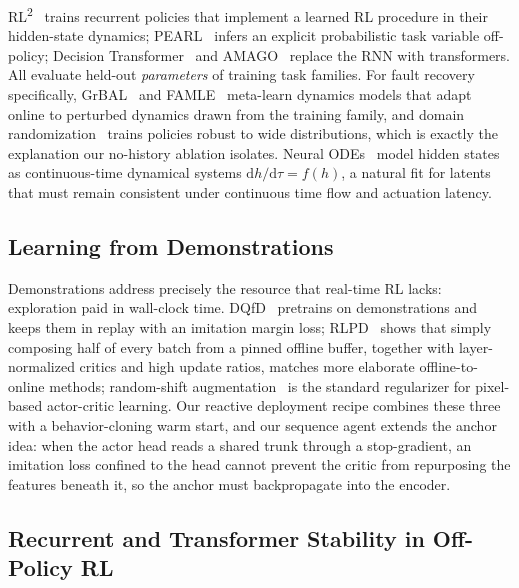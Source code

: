 \documentclass[conference]{IEEEtran}
\newcommand{\rltwo}{RL\textsuperscript{2}}
\begin{document}
\rltwo{}~\cite{rl2,wang2016learning} trains recurrent policies that implement a learned RL procedure in their hidden-state dynamics; PEARL~\cite{pearl} infers an explicit probabilistic task variable off-policy; Decision Transformer~\cite{decisiontransformer} and AMAGO~\cite{amago} replace the RNN with transformers. All evaluate held-out \emph{parameters} of training task families. For fault recovery specifically, GrBAL~\cite{grbal} and FAMLE~\cite{famle} meta-learn dynamics models that adapt online to perturbed dynamics drawn from the training family, and domain randomization~\cite{tobin2017domain} trains policies robust to wide distributions, which is exactly the explanation our no-history ablation isolates. Neural ODEs~\cite{neuralode} model hidden states as continuous-time dynamical systems $\mathrm{d}h/\mathrm{d}\tau = f(h)$, a natural fit for latents that must remain consistent under continuous time flow and actuation latency.



\subsection{Learning from Demonstrations}

Demonstrations address precisely the resource that real-time RL lacks: exploration paid in wall-clock time. DQfD~\cite{dqfd} pretrains on demonstrations and keeps them in replay with an imitation margin loss; RLPD~\cite{rlpd} shows that simply composing half of every batch from a pinned offline buffer, together with layer-normalized critics and high update ratios, matches more elaborate offline-to-online methods; random-shift augmentation~\cite{drq} is the standard regularizer for pixel-based actor-critic learning. Our reactive deployment recipe combines these three with a behavior-cloning warm start, and our sequence agent extends the anchor idea: when the actor head reads a shared trunk through a stop-gradient, an imitation loss confined to the head cannot prevent the critic from repurposing the features beneath it, so the anchor must backpropagate into the encoder.



\subsection{Recurrent and Transformer Stability in Off-Policy RL}
\end{document}
